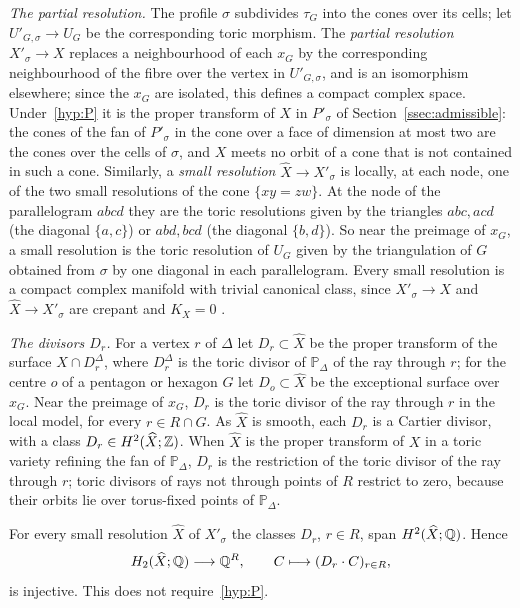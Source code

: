 \emph{The partial resolution.} The profile $\sigma$ subdivides $\tau_G$ into the cones over its cells; let
$U'_{G,\sigma}\to U_G$ be the corresponding toric morphism. The \emph{partial resolution} $X'_\sigma\to X$ replaces a
neighbourhood of each $x_G$ by the corresponding neighbourhood of the fibre over the vertex in $U'_{G,\sigma}$, and is an
isomorphism elsewhere; since the $x_G$ are isolated, this defines a compact complex space. Under~\ref{hyp:P} it is the
proper transform of $X$ in $P'_\sigma$ of Section~\ref{ssec:admissible}: the cones of the fan of $P'_\sigma$ in the cone
over a face of dimension at most two are the cones over the cells of $\sigma$, and $X$ meets no orbit of a cone that is
not contained in such a cone. Similarly, a \emph{small resolution} $\widehat X\to X'_\sigma$ is locally, at each node,
one of the two small resolutions of the cone $\{xy=zw\}$. At the node of the parallelogram $abcd$ they are the toric
resolutions given by the triangles $abc,acd$ (the diagonal $\{a,c\}$) or $abd,bcd$ (the diagonal $\{b,d\}$). So near the
preimage of $x_G$, a small resolution is the toric resolution of $U_G$ given by the triangulation of $G$ obtained from
$\sigma$ by one diagonal in each parallelogram. Every small resolution is a compact complex manifold with trivial
canonical class, since $X'_\sigma\to X$ and $\widehat X\to X'_\sigma$ are crepant and $K_X=0$ \cite[\S4]{Batyrev}.

\emph{The divisors $D_r$.} For a vertex $r$ of $\Delta$ let $D_r\subset\widehat X$ be the proper transform of the surface
$X\cap D^\Delta_r$, where $D^\Delta_r$ is the toric divisor of $\mathbb P_\Delta$ of the ray through $r$; for the centre $o$
of a pentagon or hexagon $G$ let $D_o\subset\widehat X$ be the exceptional surface over $x_G$. Near the preimage of $x_G$,
$D_r$ is the toric divisor of the ray through $r$ in the local model, for every $r\in R\cap G$. As $\widehat X$ is smooth,
each $D_r$ is a Cartier divisor, with a class $D_r\in H^2(\widehat X;\mathbb Z)$. When $\widehat X$ is the proper transform of $X$
in a toric variety refining the fan of $\mathbb P_\Delta$, $D_r$ is the restriction of the toric divisor of the ray through
$r$; toric divisors of rays not through points of $R$ restrict to zero, because their orbits lie over torus-fixed points
of $\mathbb P_\Delta$.

\begin{lemma}\label{lem:H2}
For every small resolution $\widehat X$ of $X'_\sigma$ the classes $D_r$, $r\in R$, span $H^2(\widehat X;\mathbb Q)$. Hence
\begin{equation}\label{eq:injection}
H_2(\widehat X;\mathbb Q)\longrightarrow\mathbb Q^R,\qquad C\longmapsto(D_r\cdot C)_{r\in R},
\end{equation}
is injective. This does not require~\ref{hyp:P}.
\end{lemma}

